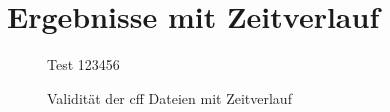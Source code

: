 \section{Ergebnisse mit Zeitverlauf}
\label{sec:gesamtheit_ergebnisse}

\begin{figure}
    
    \label{fig:overall_full_valid_cff}
    \caption{Validität der \gls{cff} Dateien mit Zeitverlauf}
    \small
    Test 123456
\end{figure}
